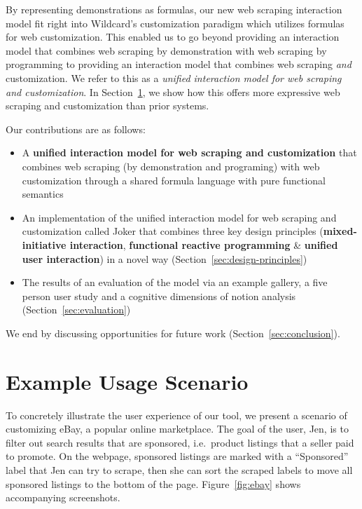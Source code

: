 \documentclass[sigconf,10pt]{acmart}
\providecommand{\tightlist}{%
  \setlength{\itemsep}{0pt}\setlength{\parskip}{0pt}}
\begin{document}
By representing demonstrations as formulas, our new web scraping
interaction model fit right into Wildcard's customization paradigm which
utilizes formulas for web customization. This enabled us to go beyond
providing an interaction model that combines web scraping by
demonstration with web scraping by programming to providing an
interaction model that combines web scraping \emph{and} customization.
We refer to this as a \emph{unified interaction model for web scraping
and customization}. In Section~\ref{sec:examples}, we show how this
offers more expressive web scraping and customization than prior
systems.

Our contributions are as follows:

\begin{itemize}
\tightlist
\item
  A \textbf{unified interaction model for web scraping and
  customization} that combines web scraping (by demonstration and
  programing) with web customization through a shared formula language
  with pure functional semantics
\item
  An implementation of the unified interaction model for web scraping
  and customization called Joker that combines three key design
  principles (\textbf{mixed-initiative interaction}, \textbf{functional
  reactive programming} \& \textbf{unified user interaction}) in a novel
  way (Section~\ref{sec:design-principles})
\item
  The results of an evaluation of the model via an example gallery, a
  five person user study and a cognitive dimensions of notion analysis
  (Section~\ref{sec:evaluation})
\end{itemize}

We end by discussing opportunities for future work
(Section~\ref{sec:conclusion}).

\hypertarget{sec:examples}{%
\section{Example Usage Scenario}\label{sec:examples}}

To concretely illustrate the user experience of our tool, we present a
scenario of customizing eBay, a popular online marketplace. The goal of
the user, Jen, is to filter out search results that are sponsored,
i.e.~product listings that a seller paid to promote. On the webpage,
sponsored listings are marked with a ``Sponsored'' label that Jen can
try to scrape, then she can sort the scraped labels to move all
sponsored listings to the bottom of the page. Figure~\ref{fig:ebay}
shows accompanying screenshots.
\end{document}
